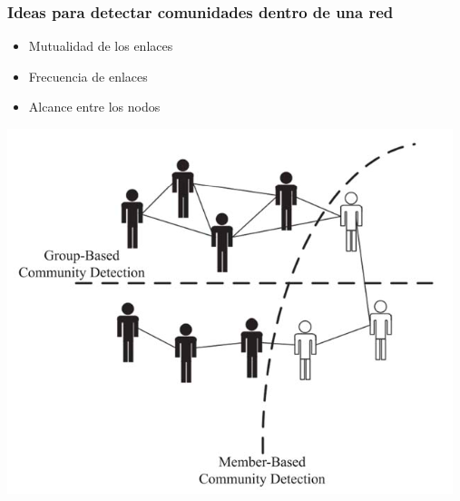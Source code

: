 \documentclass[
10pt, %
aspectratio=169, %
]{beamer}
\begin{document}
	\begin{frame}
		
		\frametitle{Ideas para detectar comunidades dentro de una red}
		
		\begin{minipage}{0.35\textwidth}
			
			\begin{itemize}
				\item Mutualidad de los enlaces \\[2mm]
				
				\item Frecuencia de enlaces \\[2mm]
				
				\item Alcance entre los nodos 
				
			\end{itemize}
		
		\end{minipage}%
		\hfill
		\begin{minipage}{0.6\textwidth}
		
			\pause
			\centering
			\includegraphics[scale=0.45]{tipos-de-comunidades.png}
		
		\end{minipage}%
		
		
	\end{frame}
	
\end{document}
